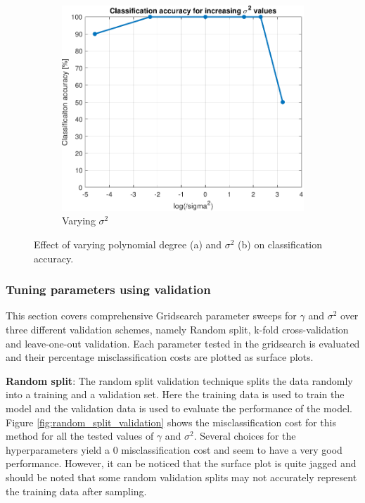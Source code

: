 \documentclass{article}
\begin{document}
\begin{figure}[h]
\begin{subfigure}[b]{0.4\textwidth}
                     \includegraphics[width=\textwidth]{Assignment 1/figures/class_acc_sigma2_val.pdf}
                    \caption{Varying $\sigma^2$}
                     \label{fig:rbf_sigma2}
                 \end{subfigure}
                 \hspace{0.05\textwidth}
                \caption{Effect of varying polynomial degree (a) and $\sigma^2$ (b) on classification accuracy. }
            \end{figure}
            
            
        \subsubsection{Tuning parameters using validation}
            This section covers comprehensive Gridsearch parameter sweeps for $\gamma$ and $\sigma^2$ over three different validation schemes, namely Random split, k-fold cross-validation and leave-one-out validation. Each parameter tested in the gridsearch is evaluated and their percentage misclassification costs are plotted as surface plots. 
            
            \noindent \textbf{Random split}: \newline
            The random split validation technique splits the data randomly into a training and a validation set. Here the training data is used to train the model and the validation data is used to evaluate the performance of the model. Figure \ref{fig:random_split_validation} shows the misclassification cost for this method for all the tested values of $\gamma$ and $\sigma^2$. Several choices for the hyperparameters yield a 0 misclassification cost and seem to have a very good performance. However, it can be noticed that the surface plot is quite jagged and should be noted that some random validation splits may not accurately represent the training data after sampling.
            
\end{document}
